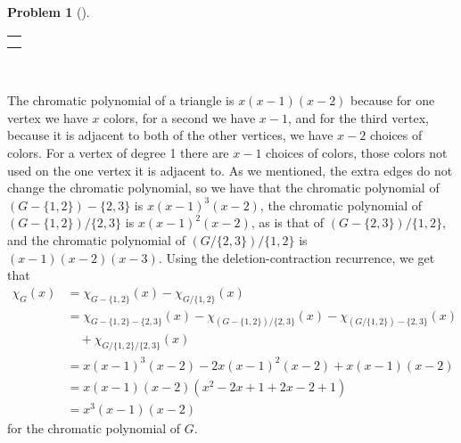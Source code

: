 \documentclass[10pt,]{book}
\theoremstyle{plain}
\theoremstyle{definition}
\newtheorem{activity}[project]{Problem}
\theoremstyle{definition}
\numberwithin{equation}{chapter}
\newlength{\panelmax}
\newcommand{\amp}{&}
\begin{document}
\begin{activity}[]
{%
\setlength{\panelmax}{0pt}
\newsavebox{\panelboxABimage}
\newlength{\phABimage}\setlength{\phABimage}{\ht\panelboxABimage+\dp\panelboxABimage}
\settototalheight{\phABimage}{\usebox{\panelboxABimage}}
\setlength{\panelmax}{\maxof{\panelmax}{\phABimage}}
\leavevmode%
\setlength{\tabcolsep}{0\linewidth}
\par\medskip\noindent
\hspace*{0.025\linewidth}%
\begin{tabular}{@{}*{1}{c}@{}}
\begin{minipage}[c][\panelmax][t]{0.95\linewidth}\usebox{\panelboxABimage}\end{minipage}\tabularnewline
\parbox[t]{0.95\linewidth}{
}\end{tabular}\\
}%
\par
The chromatic polynomial of a triangle is \(x(x-1)(x-2)\) because for one vertex we have \(x\) colors, for a second we have \(x-1\), and for the third vertex, because it is adjacent to both of the other vertices, we have \(x-2\) choices of colors. For a vertex of degree 1 there are \(x-1\) choices of colors, those colors not used on the one vertex it is adjacent to. As we mentioned, the extra edges do not change the chromatic polynomial, so we have that the chromatic polynomial of \((G-\{1,2\})-\{2,3\}\) is \(x(x-1)^3(x-2)\), the chromatic polynomial of \((G-\{1,2\})/\{2,3\}\) is \(x(x-1)^2(x-2)\), as is that of \((G-\{2,3\})/\{1,2\}\), and the chromatic polynomial of \((G/\{2,3\})/\{1,2\}\) is \((x-1)(x-2)(x-3)\). Using the deletion-contraction recurrence, we get that%
\begin{align*}
\chi_G(x)  \amp =  \chi_{G-\{1,2\}}(x) - \chi_{G/\{1,2\}}(x)\\
\amp =
\chi_{G-\{1,2\}-\{2,3\}}(x)-\chi_{(G-\{1,2\})/\{2,3\}}(x)-
\chi_{(G/\{1,2\})-\{2,3\}}(x)\\
\amp \quad +  \chi_{G/\{1,2\}/\{2,3\}}(x)\\
\amp =  x(x-1)^3(x-2)-2x(x-1)^2(x-2) + x(x-1)(x-2)\\
\amp =  x(x-1)(x-2)(x^2-2x+1 +2x-2 +1)\\
\amp =  x^3(x-1)(x-2)
\end{align*}
for the chromatic polynomial of \(G\).%
\end{activity}
\end{document}
